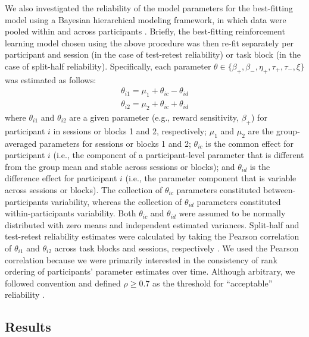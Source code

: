 \documentclass[a4paper,12pt]{article}
\begin{document}
\begin{refsection}[main]
We also investigated the reliability of the model parameters for the best-fitting model using a Bayesian hierarchical modeling framework, in which data were pooled within and across participants \cite{rouder2019psychometrics}. Briefly, the best-fitting reinforcement learning model chosen using the above procedure was then re-fit separately per participant and session (in the case of test-retest reliability) or task block (in the case of split-half reliability). Specifically, each parameter $\theta \in \{\beta_+, \beta_-, \eta_+, \tau_+, \tau_-, \xi \}$ was estimated as follows:
\begin{equation}
\begin{split}
    \theta_{i1} = \mu_1 + \theta_{ic} - \theta_{id} \\
    \theta_{i2} = \mu_2 + \theta_{ic} + \theta_{id}
\end{split}
\end{equation}
where $\theta_{i1}$ and $\theta_{i2}$ are a given parameter (e.g., reward sensitivity, $\beta_+$) for participant $i$ in sessions or blocks 1 and 2, respectively; $\mu_1$ and $\mu_2$ are the group-averaged parameters for sessions or blocks 1 and 2; $\theta_{ic}$ is the common effect for participant $i$ (i.e., the component of a participant-level parameter that is different from the group mean and stable across sessions or blocks); and $\theta_{id}$ is the difference effect for participant $i$ (i.e., the parameter component that is variable across sessions or blocks). The collection of $\theta_{ic}$ parameters constituted between-participants variability, whereas the collection of $\theta_{id}$ parameters constituted within-participants variability. Both $\theta_{ic}$ and $\theta_{id}$ were assumed to be normally distributed with zero means and independent estimated variances. Split-half and test-retest reliability estimates were calculated by taking the Pearson correlation of $\theta_{i1}$ and $\theta_{i2}$ across task blocks and sessions, respectively \cite{brown2020improving, pike2022test}. We used the Pearson correlation because we were primarily interested in the consistency of rank ordering of participants' parameter estimates over time. Although arbitrary, we followed convention and defined $\rho \geq 0.7$ as the threshold for ``acceptable'' reliability \cite{cicchetti1994guidelines}.  

\subsection*{Results}


\end{refsection}
\end{document}
